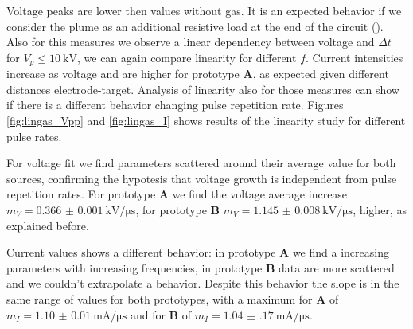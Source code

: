 Voltage peaks are lower then values without gas. It is an expected behavior if we consider the plume as an additional resistive load at the end of the circuit (\cite{lieberman1994principles}). Also for this measures we observe a linear dependency between voltage and $\Delta t$ for $V_{p} \le \SI{10}{\kilo\volt}$, we can again compare linearity for different $f$. Current intensities increase as voltage and are higher for prototype \textbf{A}, as expected given different distances electrode-target. Analysis of linearity also for those measures can show if there is a different behavior changing pulse repetition rate.
Figures \ref{fig:lingas_Vpp} and \ref{fig:lingas_I} shows results of the linearity study for different pulse rates.

For voltage fit we find parameters scattered around their average value for both sources, confirming the hypotesis that voltage growth is independent from pulse repetition rates. For prototype \textbf{A} we find the voltage average increase $m_{V} = \SI{0.366(1)}{\kilo\volt/\micro\second}$, for prototype \textbf{B} $m_{V} = \SI{1.145(8)}{\kilo\volt/\micro\second}$, higher, as explained before.

Current values shows a different behavior: in prototype \textbf{A} we find a increasing parameters with increasing frequencies, in prototype \textbf{B} data are more scattered and we couldn't extrapolate a behavior. Despite this behavior the slope is in the same range of values for both prototypes, with a maximum for \textbf{A} of $m_{I} = \SI{1.10(1)}{\milli\ampere/\micro\second}$ and for \textbf{B} of $m_{I} = \SI{1.04(17)}{\milli\ampere/\micro\second}$.

